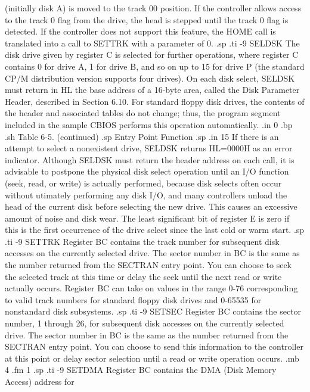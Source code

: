 (initially disk A) is moved to the track 00 position.  If the controller
allows access to the track 0 flag from the drive, the head is 
stepped until the track 0 flag is detected.  If the controller 
does not support this feature, the HOME
call is translated into a call to SETTRK with a parameter of 0.
.sp
.ti -9
SELDSK   The disk drive given by register C is selected for further
operations, where register C contains 0 for drive A, 1 for drive B, and so
on up to 15 for drive P (the standard CP/M distribution version supports four
drives).  On each disk select, SELDSK must return in HL the base address of a
16-byte area, called the Disk Parameter Header, described in Section 6.10.
For standard floppy disk drives, the contents of the header and associated
tables do not change; thus, the program segment included in the sample CBIOS
performs this operation automatically.
.in 0
.bp
.sh
                     Table 6-5.  (continued)
.sp
   Entry Point                    Function
.sp
.in 15
If there is an attempt to select a
nonexistent drive, SELDSK returns HL=0000H as an error indicator.  
Although SELDSK must return the header address on each call, it is advisable
to postpone the physical disk select operation until an I/O function (seek,
read, or write) is actually performed, because disk selects often occur
without utimately performing any disk I/O, and many controllers unload
the head of the current disk before selecting the new drive.  This
causes an excessive amount of noise and disk wear.  The least significant bit
of register E is zero if this is the first occurrence of the drive select
since the last cold or warm start.
.sp
.ti -9
SETTRK   Register BC contains the track number for subsequent disk accesses
on the currently selected drive.  The sector number in BC is the same as the
number returned from the SECTRAN entry point.  You can choose to seek
the selected track at this time or delay the seek until the next read or
write actually occurs.  Register BC can take on values in the range 0-76
corresponding to valid track numbers for standard floppy disk drives and
0-65535 for nonstandard disk subsystems.
.sp
.ti -9
SETSEC   Register BC contains the sector number, 1 through 26, for subsequent
disk accesses on the currently selected drive.  The sector number in BC is
the same as the number returned from the SECTRAN entry point.  You can
choose to send this information to the controller at this point or delay
sector selection until a read or write operation occurs.
.mb 4
.fm 1
.sp
.ti -9
SETDMA   Register BC contains the DMA (Disk Memory Access) address for
